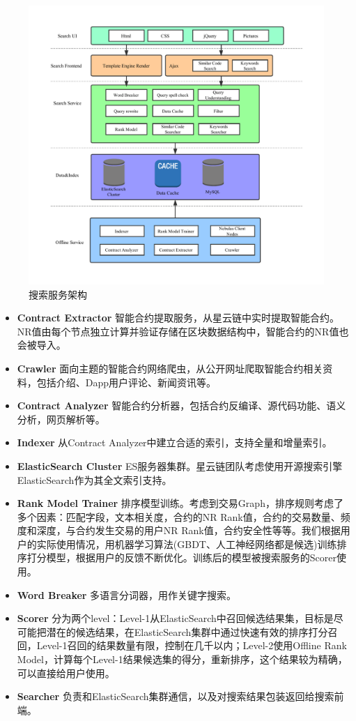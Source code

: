 \begin{figure}
\centering
\includegraphics[width=16cm]{./figs/search-arch.pdf}
\caption{搜索服务架构}
\label{fig:search-arch}
\end{figure}

\begin{itemize}
	\item \textbf{Contract Extractor} 智能合约提取服务，从星云链中实时提取智能合约。NR值由每个节点独立计算并验证存储在区块数据结构中，智能合约的NR值也会被导入。
	\item \textbf{Crawler} 面向主题的智能合约网络爬虫，从公开网址爬取智能合约相关资料，包括介绍、Dapp用户评论、新闻资讯等。
	\item \textbf{Contract Analyzer} 智能合约分析器，包括合约反编译、源代码功能、语义分析，网页解析等。
	\item \textbf{Indexer} 从Contract Analyzer中建立合适的索引，支持全量和增量索引。
	\item \textbf{ElasticSearch Cluster} ES服务器集群。星云链团队考虑使用开源搜索引擎ElasticSearch作为其全文索引支持。
	\item \textbf{Rank Model Trainer} 排序模型训练。考虑到交易Graph，排序规则考虑了多个因素：匹配字段，文本相关度，合约的NR Rank值，合约的交易数量、频度和深度，与合约发生交易的用户NR Rank值，合约安全性等等。我们根据用户的实际使用情况，用机器学习算法(GBDT、人工神经网络都是候选)训练排序打分模型，根据用户的反馈不断优化。训练后的模型被搜索服务的Scorer使用。
	\item \textbf{Word Breaker} 多语言分词器，用作关键字搜索。
	\item \textbf{Scorer} 分为两个level：Level-1从ElasticSearch中召回候选结果集，目标是尽可能把潜在的候选结果，在ElasticSearch集群中通过快速有效的排序打分召回，Level-1召回的结果数量有限，控制在几千以内；Level-2使用Offline Rank Model，计算每个Level-1结果候选集的得分，重新排序，这个结果较为精确，可以直接给用户使用。
	\item \textbf{Searcher} 负责和ElasticSearch集群通信，以及对搜索结果包装返回给搜索前端。
\end{itemize}

